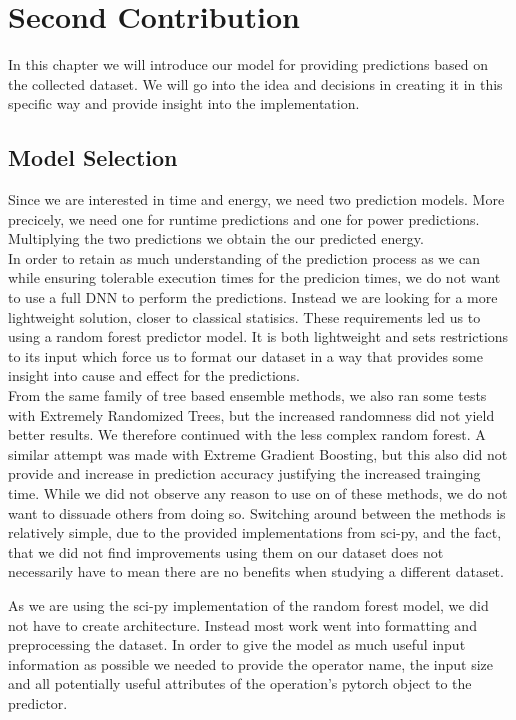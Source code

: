\chapter{Second Contribution}\label{chap:contrib2}

In this chapter we will introduce our model for providing predictions based on the collected dataset. We will go into the idea and decisions in creating it in this specific way and provide insight into the implementation.


\section{Model Selection}
Since we are interested in time and energy, we need two prediction models. More precicely, we need one for runtime predictions and one for power predictions. Multiplying the two predictions we obtain the our predicted energy. \\
In order to retain as much understanding of the prediction process as we can while ensuring tolerable execution times for the predicion times, we do not want to use a full DNN to perform the predictions. Instead we are looking for a more lightweight solution, closer to classical statisics. These requirements led us to using a random forest predictor model. It is both lightweight and sets restrictions to its input which force us to format our dataset in a way that provides some insight into cause and effect for the predictions. \\
From the same family of tree based ensemble methods, we also ran some tests with Extremely Randomized Trees, but the increased randomness did not yield better results. We therefore continued with the less complex random forest. A similar attempt was made with Extreme Gradient Boosting, but this also did not provide and increase in prediction accuracy justifying the increased trainging time. While we did not observe any reason to use on of these methods, we do not want to dissuade others from doing so. Switching around between the methods is relatively simple, due to the provided implementations from sci-py, and the fact, that we did not find improvements using them on our dataset does not necessarily have to mean there are no benefits when studying a different dataset.



As we are using the sci-py implementation of the random forest model, we did not have to create architecture. Instead most work went into formatting and preprocessing the dataset. In order to give the model as much useful input information as possible we needed to provide the operator name, the input size and all potentially useful attributes of the operation's pytorch object to the predictor. 
